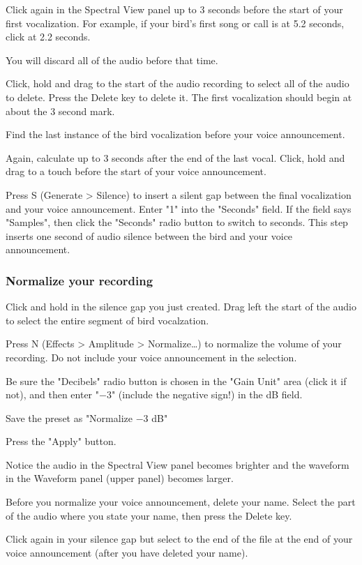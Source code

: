 \documentclass[12pt]{article}
\begin{document}
Click again in the Spectral View panel up to 3 seconds before the start of your first vocalization. For example, if your bird's first song or call is at 5.2 seconds, click at 2.2 seconds. 

You will discard all of the audio before that time.

Click, hold and drag to the start of the audio recording to select all of the audio to delete. Press the Delete key to delete it. The first vocalization should begin at about the 3 second mark.

Find the last instance of the bird vocalization before your voice announcement.

Again, calculate up to 3 seconds after the end of the last vocal. Click, hold and drag to a touch before the start of your voice announcement.

Press S (Generate > Silence) to insert a silent gap between the final vocalization and your voice announcement. Enter "1" into the "Seconds" field. If the field says "Samples", then click the "Seconds" radio button to switch to seconds. This step inserts one second of audio silence between the bird and your voice announcement.

\subsubsection*{Normalize your recording}

Click and hold in the silence gap you just created. Drag left the start of the audio to select the entire segment of bird vocalzation. 

Press N (Effects > Amplitude > Normalize\ldots) to normalize the volume of your recording. Do not include your voice announcement in the selection.

Be sure the "Decibels" radio button is chosen in the "Gain Unit" area (click it if not), and then enter "$-$3" (include the negative sign!) in the dB field. 

Save the preset as "Normalize $-$3 dB" 

Press the "Apply" button.

Notice the audio in the Spectral View panel becomes brighter and the waveform in the Waveform panel (upper panel) becomes larger. 

Before you normalize your voice announcement, delete your name. Select the part of the audio where you state your name, then press the Delete key.

Click again in your silence gap but select to the end of the file at the end of your voice announcement (after you have deleted your name). 
\end{document}
